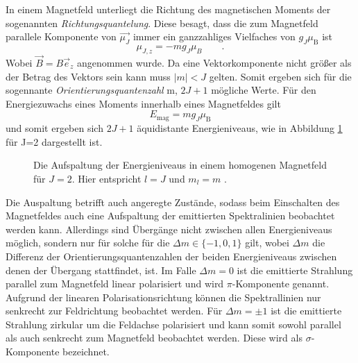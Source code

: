 In einem Magnetfeld unterliegt die Richtung des magnetischen Moments der sogenannten \textit{Richtungsquantelung}. Diese besagt, dass die zum Magnetfeld parallele Komponente von $\vec{\mu_J}$ immer ein ganzzahliges Vielfaches von $g_J\mu_{\text{B}}$ ist
\begin{equation}
\mu_{J,z}= -m g_J\mu_B \qquad .
\end{equation}
Wobei $\vec{B}=B\vec{e}_z$ angenommen wurde.
Da eine Vektorkomponente nicht größer als der Betrag des Vektors sein kann muss $|m|< J$ gelten. Somit ergeben sich für die sogennante \textit{Orientierungsquantenzahl} m, $2J+1$ mögliche Werte.
Für den Energiezuwachs eines Moments innerhalb eines Magnetfeldes gilt
\begin{equation}
E_\text{mag} = mg_J\mu_\text{B}
\end{equation}
und somit ergeben sich $2J+1$ äquidistante Energieniveaus, wie in Abbildung \ref{fig:tfig2} für J=2 dargestellt ist.

\begin{figure}
\centering
\caption{Die Aufspaltung der Energieniveaus in einem homogenen Magnetfeld für $J=2$. Hier entspricht $l=J$ und $m_l=m$ \cite{quelle04}.}
\label{fig:tfig2}
\end{figure}

Die Auspaltung betrifft auch angeregte Zustände, sodass beim Einschalten des Magnetfeldes auch eine Aufspaltung der emittierten Spektralinien beobachtet werden kann. Allerdings sind Übergänge nicht zwischen allen 
Energieniveaus möglich, sondern nur für solche für die $\Delta m \in \{-1, 0, 1\}$ gilt, wobei $\Delta m$ die Differenz der Orientierungsquantenzahlen der beiden Energieniveaus zwischen denen der Übergang stattfindet, ist.
Im Falle $\Delta m = 0$ ist die emittierte Strahlung parallel zum Magnetfeld linear polarisiert und wird $\pi$-Komponente genannt. Aufgrund der linearen Polarisationsrichtung können die Spektrallinien nur senkrecht zur Feldrichtung
beobachtet werden. Für $\Delta m = \pm 1$ ist die emittierte Strahlung zirkular um die Feldachse polarisiert und kann somit sowohl parallel als auch senkrecht zum Magnetfeld beobachtet werden. Diese wird als $\sigma$-Komponente bezeichnet.

